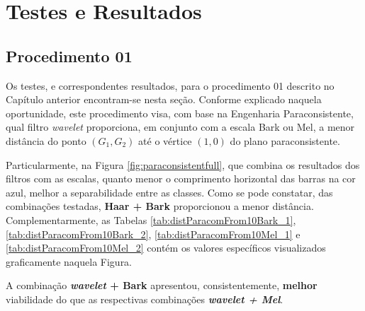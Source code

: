 \chapter{Testes e Resultados} \label{chap:testsResults}
	\section{Procedimento 01}
	\label{chap:testsResults:sec:Experimento01}
	Os testes, e correspondentes resultados, para o procedimento 01 descrito no Capítulo anterior encontram-se nesta seção. Conforme explicado naquela oportunidade, este procedimento visa, com base na Engenharia Paraconsistente, qual filtro \textit{wavelet} proporciona, em conjunto com a escala Bark ou Mel, a menor distância do ponto $(G_1,G_2)$ até o vértice $(1,0)$ do plano paraconsistente. 

	\par Particularmente, na Figura \ref{fig:paraconsistentfull}, que combina os resultados dos filtros com as escalas, quanto menor o comprimento horizontal das barras na cor azul, melhor a separabilidade entre as classes. Como se pode constatar, das combinações testadas, \textbf{Haar + Bark} proporcionou a menor distância. Complementarmente, as Tabelas \ref{tab:distParacomFrom10Bark_1}, \ref{tab:distParacomFrom10Bark_2}, \ref{tab:distParacomFrom10Mel_1} e \ref{tab:distParacomFrom10Mel_2} contém os valores específicos visualizados graficamente naquela Figura.
	
	\par A combinação \textbf{\textit{wavelet} + Bark} apresentou, consistentemente, \textbf{melhor} viabilidade do que as respectivas combinações \textbf{\textit{wavelet + Mel}}.
	
